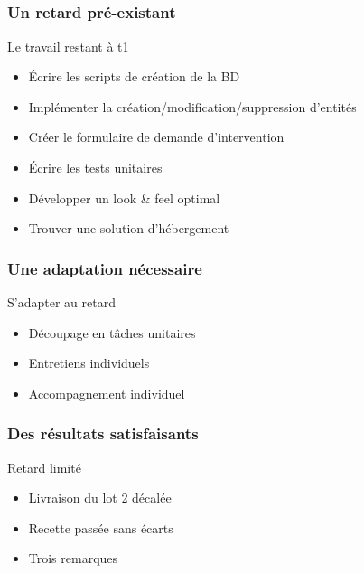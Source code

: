 \speaker{\Pierre{}}
\subsection{} %

\begin{frame}
\frametitle{Un retard pré-existant}
\begin{block}{Le travail restant à t1}
\begin{itemize}
	\item Écrire les scripts de création de la BD
	\item Implémenter la création/modification/suppression d'entités
	\item Créer le formulaire de demande d'intervention
	\item Écrire les tests unitaires
	\item Développer un look \& feel optimal
	\item Trouver une solution d’hébergement
\end{itemize}
\end{block}
\end{frame}


\begin{frame}
\frametitle{Une adaptation nécessaire}
\begin{block}{S'adapter au retard}
\begin{itemize}
	\item Découpage en tâches unitaires
	\item Entretiens individuels
	\item Accompagnement individuel
\end{itemize}
\end{block}
\end{frame}


\begin{frame}
\frametitle{Des résultats satisfaisants}
\begin{block}{Retard limité}
\begin{itemize}
	\item Livraison du lot 2 décalée
	\item Recette passée sans écarts
	\item Trois remarques
\end{itemize}
\end{block}
\end{frame}


